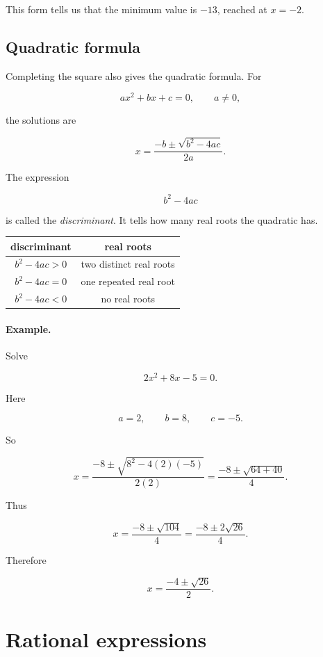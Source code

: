This form tells us that the minimum value is \(-13\), reached at \(x=-2\).

\subsection{Quadratic formula}
\label{appsubsec:quadratic-formula}

Completing the square also gives the quadratic formula.  For

\[
ax^2+bx+c=0,
\qquad a\neq0,
\]

the solutions are

\[
\boxed{
x=\frac{-b\pm\sqrt{b^2-4ac}}{2a}.
}
\]

The expression

\[
b^2-4ac
\]

is called the \emph{discriminant}.  It tells how many real roots the quadratic has.

\begin{center}
\renewcommand{\arraystretch}{1.4}
\begin{tabular}{c|c}
\textbf{discriminant} & \textbf{real roots} \\ \hline
\(b^2-4ac>0\) & two distinct real roots \\
\(b^2-4ac=0\) & one repeated real root \\
\(b^2-4ac<0\) & no real roots
\end{tabular}
\end{center}

\paragraph{Example.}
Solve

\[
2x^2+8x-5=0.
\]

Here

\[
a=2,\qquad b=8,\qquad c=-5.
\]

So

\[
x=\frac{-8\pm\sqrt{8^2-4(2)(-5)}}{2(2)}
=
\frac{-8\pm\sqrt{64+40}}{4}.
\]

Thus

\[
x=\frac{-8\pm\sqrt{104}}4
=
\frac{-8\pm2\sqrt{26}}4.
\]

Therefore

\[
\boxed{
x=\frac{-4\pm\sqrt{26}}2.
}
\]

\section{Rational expressions}
\label{appsec:rational-expressions}

